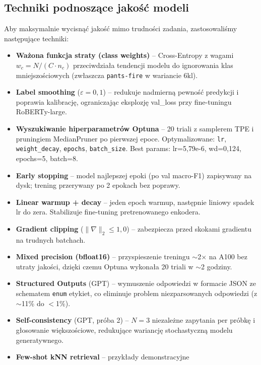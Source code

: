 \documentclass[11pt,a4paper]{article}
\begin{document}
\subsection{Techniki podnoszące jakość modeli}

Aby maksymalnie wycisnąć jakość mimo trudności zadania, zastosowaliśmy
następujące techniki:

\begin{itemize}
  \item \textbf{Ważona funkcja straty (class weights)} -- Cross-Entropy
        z wagami $w_c = N / (C \cdot n_c)$ przeciwdziała tendencji modelu
        do ignorowania klas mniejszościowych (zwłaszcza \texttt{pants-fire}
        w wariancie 6kl).
  \item \textbf{Label smoothing} ($\varepsilon=0{,}1$) -- redukuje
        nadmierną pewność predykcji i poprawia kalibrację, ograniczając
        eksplozję val\_loss przy fine-tuningu RoBERTy-large.
  \item \textbf{Wyszukiwanie hiperparametrów Optuna} -- 20 triali z
        samplerem TPE i pruningiem MedianPruner po pierwszej epoce.
        Optymalizowane: \texttt{lr}, \texttt{weight\_decay},
        \texttt{epochs}, \texttt{batch\_size}. Best params: lr=5{,}79e-6,
        wd=0{,}124, epochs=5, batch=8.
  \item \textbf{Early stopping} -- model najlepszej epoki (po val
        macro-F1) zapisywany na dysk; trening przerywany po 2 epokach
        bez poprawy.
  \item \textbf{Linear warmup + decay} -- jeden epoch warmup, następnie
        liniowy spadek lr do zera. Stabilizuje fine-tuning pretrenowanego
        enkodera.
  \item \textbf{Gradient clipping} ($\|\nabla\|_2 \le 1{,}0$) --
        zabezpiecza przed skokami gradientu na trudnych batchach.
  \item \textbf{Mixed precision (bfloat16)} -- przyspieszenie treningu
        $\sim$2$\times$ na A100 bez utraty jakości, dzięki czemu Optuna
        wykonała 20 triali w $\sim$2 godziny.
  \item \textbf{Structured Outputs} (GPT) -- wymuszenie odpowiedzi w
        formacie JSON ze schematem \texttt{enum} etykiet, co eliminuje
        problem niezparsowanych odpowiedzi (z $\sim$11\% do $<$1\%).
  \item \textbf{Self-consistency} (GPT, próba 2) -- $N=3$ niezależne
        zapytania per próbkę i głosowanie większościowe, redukujące
        wariancję stochastyczną modelu generatywnego.
  \item \textbf{Few-shot kNN retrieval} -- przykłady demonstracyjne

\end{itemize}
\end{document}

